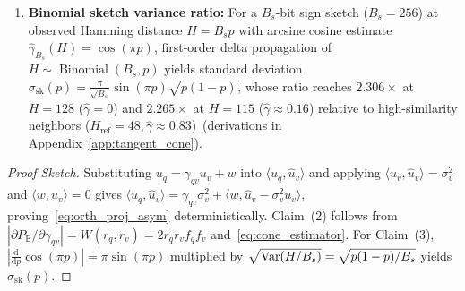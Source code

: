\begin{proposition}
\begin{enumerate}
  \item \textbf{Binomial sketch variance ratio:}
  For a $B_s$-bit sign sketch ($B_s = 256$) at observed Hamming distance $H = B_s p$ with arcsine cosine estimate $\hat{\gamma}_{B_s}(H) = \cos(\pi p)$, first-order delta propagation of $H \sim \operatorname{Binomial}(B_s, p)$ yields standard deviation $\sigma_{\mathrm{sk}}(p) = \frac{\pi}{\sqrt{B_s}}\sin(\pi p)\sqrt{p(1 - p)}$, whose ratio reaches $2.306\times$ at $H=128$ ($\hat\gamma=0$) and $2.265\times$ at $H=115$ ($\hat\gamma\approx0.16$) relative to high-similarity neighbors ($H_{\mathrm{ref}} = 48, \hat{\gamma} \approx 0.83$)\ifpreprint\ (derivations in Appendix~\ref{app:tangent_cone})\fi.
\end{enumerate}
\end{proposition}

\begin{proof}[Proof Sketch]
Substituting $u_q = \gamma_{qv} u_v + w$ into $\langle u_q, \hat{u}_v\rangle$ and applying $\langle u_v, \hat{u}_v\rangle = \sigma_v^2$ and $\langle w, u_v\rangle = 0$ gives $\langle u_q, \hat{u}_v\rangle = \gamma_{qv}\sigma_v^2 + \langle w, \hat{u}_v - \sigma_v^2 u_v\rangle$, proving~\eqref{eq:orth_proj_asym} deterministically.
Claim~(2) follows from $|\partial P_{\mathbb{B}} / \partial \gamma_{qv}| = W(r_q, r_v) = 2 r_q r_v f_q f_v$ and~\eqref{eq:cone_estimator}.
For Claim~(3), $|\frac{\mathrm{d}}{\mathrm{d}p}\cos(\pi p)| = \pi\sin(\pi p)$ multiplied by $\sqrt{\operatorname{Var}(H/B_s)} = \sqrt{p(1-p)/B_s}$ yields $\sigma_{\mathrm{sk}}(p)$.
\end{proof}
